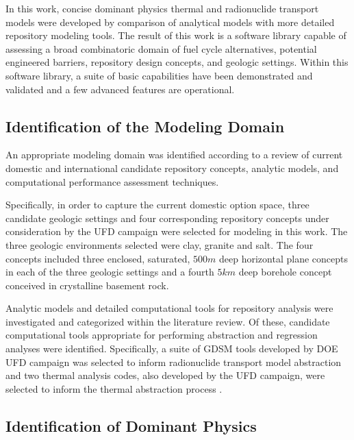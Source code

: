 
In this work, concise dominant physics thermal and radionuclide transport models 
were developed by comparison of analytical models with more detailed repository 
modeling tools. The result of this work is a software library capable 
of assessing a broad combinatoric domain of fuel cycle alternatives, potential 
engineered barriers, repository design concepts, and geologic settings. Within 
this software library, a suite of basic capabilities have been demonstrated and 
validated and a few advanced features are operational. 

\subsection{Identification of the Modeling Domain}

An appropriate modeling domain was identified according to a review of current 
domestic and international candidate repository concepts, analytic models, and 
computational performance assessment techniques.  

Specifically, in order to capture the current domestic option space, three 
candidate geologic settings and four corresponding repository concepts under 
consideration by the \gls{UFD} campaign were selected for modeling in 
this work. The three geologic environments selected were clay, granite and salt.  
The four concepts included three enclosed, saturated, $500m$ deep horizontal 
plane concepts in each of the three geologic settings and a fourth $5km$ deep 
borehole concept conceived in crystalline basement rock.


Analytic models and detailed computational tools for repository analysis were 
investigated and categorized within the literature review.  Of these, candidate 
computational tools appropriate for performing abstraction and regression 
analyses were identified. Specifically, a suite of \gls{GDSM} tools developed by
\gls{DOE} \gls{UFD} campaign was selected to inform radionuclide transport model 
abstraction\cite{clayton_generic_2011} and two thermal analysis codes, also 
developed by the \gls{UFD} 
campaign, were selected to inform the thermal abstraction process 
\cite{huff_benchmarking_2012, huff_numerical_2012, greenberg_application_2012}.


\subsection{Identification of Dominant Physics}


